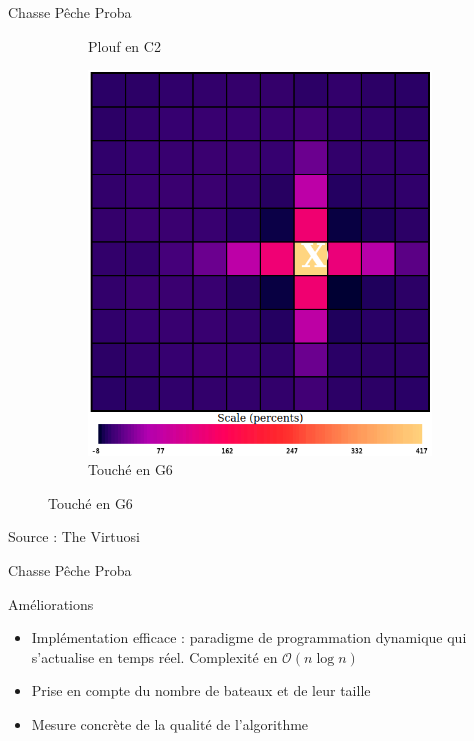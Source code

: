 \begin{frame}{Chasse Pêche Proba}
\begin{figure}
\begin{subfigure}{.32\textwidth}
                 \caption*{Plouf en C2}
                \label{fig:ploufC2}
            \end{subfigure}
            \begin{subfigure}{.32\textwidth}
                \centering
                \includegraphics[width=.95\linewidth]{images/toucheG6.png}
                 \caption*{Touché en G6}
                \label{fig:toucheG6}
            \end{subfigure}
        \end{figure}
        \hfill Source : The Virtuosi
	\end{frame}{}
	
	\begin{frame}{Chasse Pêche Proba}
	    \begin{block}{Améliorations}
	        \begin{itemize}
	            \item Implémentation efficace : paradigme de programmation dynamique qui s'actualise en temps réel. Complexité en $\mathcal{O}(n\log{}n)$ %
	            \item Prise en compte du nombre de bateaux et de leur taille
	            \item Mesure concrète de la qualité de l'algorithme
	        \end{itemize}
	    \end{block}
	\end{frame}{}
	
